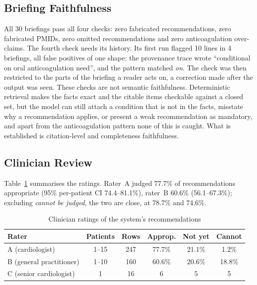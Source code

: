 \documentclass[conference]{IEEEtran}
\begin{document}
\subsection{Briefing Faithfulness}
All 30 briefings pass all four checks: zero fabricated recommendations, zero fabricated
PMIDs, zero omitted recommendations and zero anticoagulation over-claims. The fourth check
needs its history. Its first run flagged 10 lines in 4 briefings, all false positives of one
shape: the provenance trace wrote ``conditional on oral anticoagulation need'', and the
pattern matched \emph{on}. The check was then restricted to the parts of the briefing a
reader acts on, a correction made after the output was seen. These checks are not semantic
faithfulness. Deterministic retrieval makes the facts exact and the citable items checkable
against a closed set, but the model can still attach a condition that is not in the facts,
misstate why a recommendation applies, or present a weak recommendation as mandatory, and
apart from the anticoagulation pattern none of this is caught. What is established is
citation-level and completeness faithfulness.

\subsection{Clinician Review}
Table~\ref{tab:clinician} summarises the ratings. Rater~A judged 77.7\% of recommendations
appropriate (95\% per-patient CI 74.4--81.1\%), rater~B 60.6\% (56.1--67.3\%); excluding
\emph{cannot be judged}, the two are close, at 78.7\% and 74.6\%.

\begin{table}[htbp]
\caption{Clinician ratings of the system's recommendations}
\label{tab:clinician}
\begin{center}
\setlength{\tabcolsep}{3pt}
\begin{tabular}{|l|c|c|c|c|c|}
\hline
\textbf{Rater} & \textbf{Patients} & \textbf{Rows} & \textbf{Approp.} & \textbf{Not yet}
               & \textbf{Cannot} \\
\hline
A (cardiologist)        & 1--15 & 247 & 77.7\% & 21.1\% & 1.2\%  \\
B (general practitioner) & 1--10 & 160 & 60.6\% & 20.6\% & 18.8\% \\
C (senior cardiologist) & 1     & 16  & 6      & 5      & 5      \\
\hline
\end{tabular}
\end{center}
\end{table}
\end{document}
